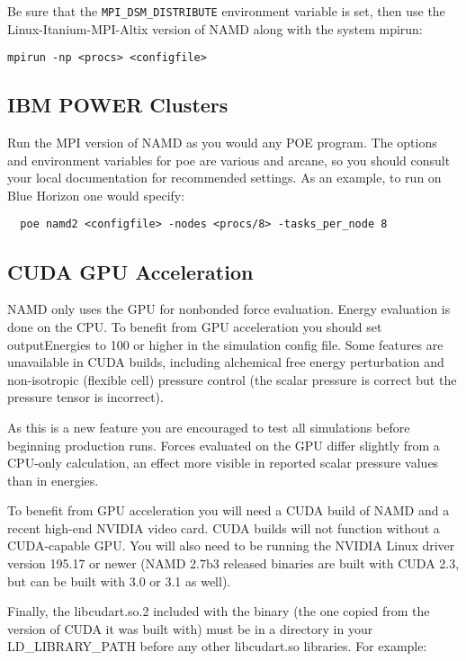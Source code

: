 Be sure that the {\tt MPI\_DSM\_DISTRIBUTE} environment variable is set, then
use the Linux-Itanium-MPI-Altix version of NAMD along with the system mpirun:

\begin{verbatim}
mpirun -np <procs> <configfile>
\end{verbatim}

\subsection{IBM POWER Clusters}

Run the MPI version of NAMD as you would any POE program.  The options
and environment variables for poe are various and arcane, so you should
consult your local documentation for recommended settings.  As an
example, to run on Blue Horizon one would specify:

\begin{verbatim}
  poe namd2 <configfile> -nodes <procs/8> -tasks_per_node 8
\end{verbatim}

\subsection{CUDA GPU Acceleration}

NAMD only uses the GPU for nonbonded force evaluation.  Energy evaluation
is done on the CPU.  To benefit from GPU acceleration you should set
outputEnergies to 100 or higher in the simulation config file.  Some
features are unavailable in CUDA builds, including alchemical free
energy perturbation and non-isotropic (flexible cell) pressure control
(the scalar pressure is correct but the pressure tensor is incorrect).

As this is a new feature you are encouraged to test all simulations
before beginning production runs.  Forces evaluated on the GPU differ
slightly from a CPU-only calculation, an effect more visible in reported
scalar pressure values than in energies.

To benefit from GPU acceleration you will need a CUDA build of NAMD
and a recent high-end NVIDIA video card.  CUDA builds will not function
without a CUDA-capable GPU.  You will also need to be running the
NVIDIA Linux driver version 195.17 or newer (NAMD 2.7b3 released binaries
are built with CUDA 2.3, but can be built with 3.0 or 3.1 as well).

Finally, the libcudart.so.2 included with the binary (the one copied from
the version of CUDA it was built with) must be in a directory in your
LD\_LIBRARY\_PATH before any other libcudart.so libraries.  For example:

